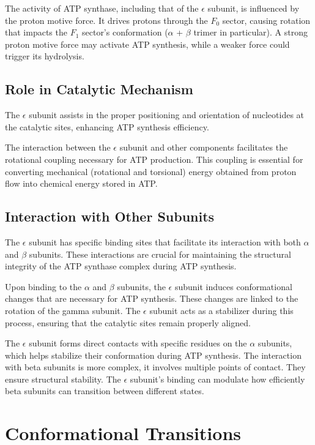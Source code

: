 \documentclass{article}
\begin{document}
The activity of ATP synthase, including that of the $\epsilon$ subunit, is influenced by the proton motive force. It drives protons through the \textit{$F_0$} sector, causing rotation that impacts the \textit{$F_1$} sector's conformation ($\alpha$ + $\beta$ trimer in particular). A strong proton motive force may activate ATP synthesis, while a weaker force could trigger its hydrolysis.

\subsection{Role in Catalytic Mechanism}

The $\epsilon$ subunit assists in the proper positioning and orientation of nucleotides at the catalytic sites, enhancing ATP synthesis efficiency.

The interaction between the $\epsilon$ subunit and other components facilitates the rotational coupling necessary for ATP production. This coupling is essential for converting mechanical (rotational and torsional) energy obtained from proton flow into chemical energy stored in ATP.

\subsection{Interaction with Other Subunits}

The $\epsilon$ subunit has specific binding sites that facilitate its interaction with both $\alpha$ and $\beta$ subunits. These interactions are crucial for maintaining the structural integrity of the ATP synthase complex during ATP synthesis.

Upon binding to the $\alpha$ and $\beta$ subunits, the $\epsilon$ subunit induces conformational changes that are necessary for ATP synthesis. These changes are linked to the rotation of the gamma subunit. The $\epsilon$ subunit acts as a stabilizer during this process, ensuring that the catalytic sites remain properly aligned.

The $\epsilon$ subunit forms direct contacts with specific residues on the $\alpha$ subunits, which helps stabilize their conformation during ATP synthesis. The interaction with beta subunits is more complex, it involves multiple points of contact. They ensure structural stability. The $\epsilon$ subunit's binding can modulate how efficiently beta subunits can transition between different states.

\section{Conformational Transitions}
\end{document}
